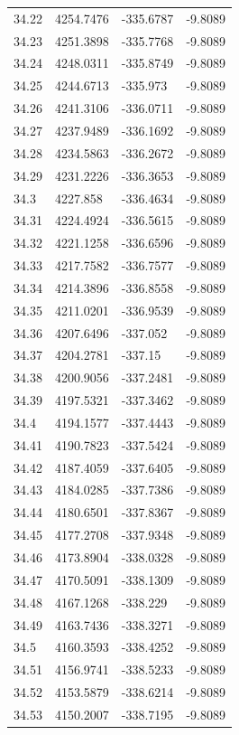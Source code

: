 \begin{table}[H]
\begin{tabular}{llll}
34.22 & 4254.7476 & -335.6787 & -9.8089 \\
34.23 & 4251.3898 & -335.7768 & -9.8089 \\
34.24 & 4248.0311 & -335.8749 & -9.8089 \\
34.25 & 4244.6713 & -335.973 & -9.8089 \\
34.26 & 4241.3106 & -336.0711 & -9.8089 \\
34.27 & 4237.9489 & -336.1692 & -9.8089 \\
34.28 & 4234.5863 & -336.2672 & -9.8089 \\
34.29 & 4231.2226 & -336.3653 & -9.8089 \\
34.3 & 4227.858 & -336.4634 & -9.8089 \\
34.31 & 4224.4924 & -336.5615 & -9.8089 \\
34.32 & 4221.1258 & -336.6596 & -9.8089 \\
34.33 & 4217.7582 & -336.7577 & -9.8089 \\
34.34 & 4214.3896 & -336.8558 & -9.8089 \\
34.35 & 4211.0201 & -336.9539 & -9.8089 \\
34.36 & 4207.6496 & -337.052 & -9.8089 \\
34.37 & 4204.2781 & -337.15 & -9.8089 \\
34.38 & 4200.9056 & -337.2481 & -9.8089 \\
34.39 & 4197.5321 & -337.3462 & -9.8089 \\
34.4 & 4194.1577 & -337.4443 & -9.8089 \\
34.41 & 4190.7823 & -337.5424 & -9.8089 \\
34.42 & 4187.4059 & -337.6405 & -9.8089 \\
34.43 & 4184.0285 & -337.7386 & -9.8089 \\
34.44 & 4180.6501 & -337.8367 & -9.8089 \\
34.45 & 4177.2708 & -337.9348 & -9.8089 \\
34.46 & 4173.8904 & -338.0328 & -9.8089 \\
34.47 & 4170.5091 & -338.1309 & -9.8089 \\
34.48 & 4167.1268 & -338.229 & -9.8089 \\
34.49 & 4163.7436 & -338.3271 & -9.8089 \\
34.5 & 4160.3593 & -338.4252 & -9.8089 \\
34.51 & 4156.9741 & -338.5233 & -9.8089 \\
34.52 & 4153.5879 & -338.6214 & -9.8089 \\
34.53 & 4150.2007 & -338.7195 & -9.8089 \\

\end{tabular}
\end{table}

